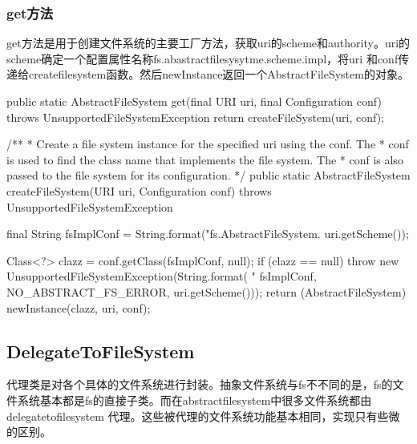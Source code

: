 \subsubsection{get方法}
get方法是用于创建文件系统的主要工厂方法，获取uri的scheme和authority。uri的scheme确定一个配置属性名称fs.abastractfilesysytme.scheme.impl，将uri 和conf传递给createfilesystem函数。然后newInstance返回一个AbstractFileSystem的对象。
\begin{java}
  public static AbstractFileSystem get(final URI uri, final Configuration conf)
      throws UnsupportedFileSystemException {
    return createFileSystem(uri, conf);
  }

    /**
   * Create a file system instance for the specified uri using the conf. The
   * conf is used to find the class name that implements the file system. The
   * conf is also passed to the file system for its configuration.
   */
  public static AbstractFileSystem createFileSystem(URI uri, Configuration conf)
      throws UnsupportedFileSystemException {
    final String fsImplConf = String.format("fs.AbstractFileSystem.%
        uri.getScheme());

    Class<?> clazz = conf.getClass(fsImplConf, null);
    if (clazz == null) {
      throw new UnsupportedFileSystemException(String.format(
          "%
          fsImplConf, NO_ABSTRACT_FS_ERROR, uri.getScheme()));
    }
    return (AbstractFileSystem) newInstance(clazz, uri, conf);
  }
\end{java}






\subsection{DelegateToFileSystem}
代理类是对各个具体的文件系统进行封装。抽象文件系统与fs不不同的是，fs的文件系统基本都是fs的直接子类。而在abstractfilesystem中很多文件系统都由delegatetofilesystem 代理。这些被代理的文件系统功能基本相同，实现只有些微的区别。

